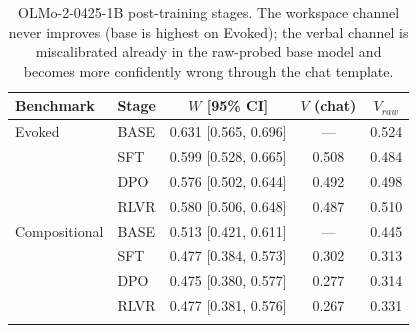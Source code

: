 \begin{table}[h]
\centering
\caption{OLMo-2-0425-1B post-training stages. The workspace channel never improves
(base is highest on Evoked); the verbal channel is miscalibrated already in the raw-probed
base model and becomes more confidently wrong through the chat template.}
\label{tab:appA5}
\small
\begin{tabular}{llccc}
\toprule
Benchmark & Stage & $W$ [95\% CI] & $V$ (chat) & $V_{raw}$ \\
\midrule
Evoked & BASE & 0.631 [0.565, 0.696] & --- & 0.524 \\
 & SFT & 0.599 [0.528, 0.665] & 0.508 & 0.484 \\
 & DPO & 0.576 [0.502, 0.644] & 0.492 & 0.498 \\
 & RLVR & 0.580 [0.506, 0.648] & 0.487 & 0.510 \\
\addlinespace
Compositional & BASE & 0.513 [0.421, 0.611] & --- & 0.445 \\
 & SFT & 0.477 [0.384, 0.573] & 0.302 & 0.313 \\
 & DPO & 0.475 [0.380, 0.577] & 0.277 & 0.314 \\
 & RLVR & 0.477 [0.381, 0.576] & 0.267 & 0.331 \\
\addlinespace
\bottomrule
\end{tabular}
\end{table}
